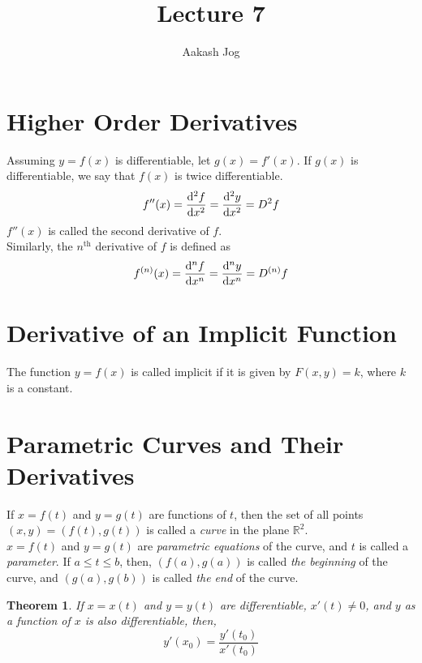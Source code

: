 \documentclass[fleqn]{article}
\title{Lecture 7}
\author{Aakash Jog}
\date{\formatdate{18}{11}{2014}}
\newtheorem{theorem}{Theorem}
\begin{document}
	
\maketitle

\tableofcontents

\newpage
\section{Higher Order Derivatives}

Assuming $y= f(x)$ is differentiable, let $g(x) = f'(x)$. If $g(x)$ is differentiable, we say that $f(x)$ is twice differentiable. 
\begin{equation*}
	f''(x) = \dod[2]{f}{x} = \dod[2]{y}{x} = D^2 f
\end{equation*}
$f''(x)$ is called the second derivative of $f$.\\
Similarly, the $n^{\text{th}}$ derivative of $f$ is defined as
\begin{equation*}
	f^{(n)}(x) = \dod[n]{f}{x} = \dod[n]{y}{x} = D^{(n)} f
\end{equation*}

\section{Derivative of an Implicit Function}

The function $y = f(x)$ is called implicit if it is given by $F(x,y) = k$, where $k$ is a constant.

\section{Parametric Curves and Their Derivatives}

If $x = f(t)$ and $y = g(t)$ are functions of $t$, then the set of all points $(x, y) = (f(t), g(t))$ is called a \emph{curve} in the plane $\mathbb{R}^2$.\\
$x = f(t)$ and $y = g(t)$ are \emph{parametric equations} of the curve, and $t$ is called a \emph{parameter}. If $a \leq t \leq b$, then, $(f(a), g(a))$ is called \emph{the beginning} of the curve, and $(g(a), g(b))$ is called \emph{the end} of the curve.

\begin{theorem}
	If $x = x(t)$ and $y = y(t)$ are differentiable, $x'(t) \neq 0$, and $y$ as a function of $x$ is also differentiable, then, 
	\begin{equation*}
		y'(x_0) = \dfrac{y'(t_0)}{x'(t_0)}
	\end{equation*}
\end{theorem}
\end{document}
